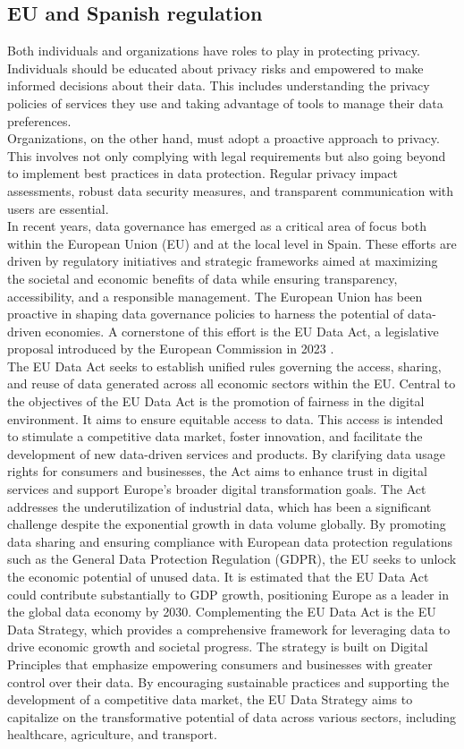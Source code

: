 \subsection{EU and Spanish regulation}
Both individuals and organizations have roles to play in protecting privacy. Individuals should be educated about privacy risks and empowered to make informed decisions about their data. This includes understanding the privacy policies of services they use and taking advantage of tools to manage their data preferences.\\
Organizations, on the other hand, must adopt a proactive approach to privacy. This involves not only complying with legal requirements but also going beyond to implement best practices in data protection. Regular privacy impact assessments, robust data security measures, and transparent communication with users are essential.\\
In recent years, data governance has emerged as a critical area of focus both within the European Union (EU) and at the local level in Spain. These efforts are driven by regulatory initiatives and strategic frameworks aimed at maximizing the societal and economic benefits of data while ensuring transparency, accessibility, and a responsible management. The European Union has been proactive in shaping data governance policies to harness the potential of data-driven economies. A cornerstone of this effort is the EU Data Act, a legislative proposal introduced by the European Commission in 2023 \cite{zotero-166}.\\
The EU Data Act seeks to establish unified rules governing the access, sharing, and reuse of data generated across all economic sectors within the EU.
Central to the objectives of the EU Data Act is the promotion of fairness in the digital environment. It aims to ensure equitable access to data. This access is intended to stimulate a competitive data market, foster innovation, and facilitate the development of new data-driven services and products. By clarifying data usage rights for consumers and businesses, the Act aims to enhance trust in digital services and support Europe's broader digital transformation goals.
The Act addresses the underutilization of industrial data, which has been a significant challenge despite the exponential growth in data volume globally. By promoting data sharing and ensuring compliance with European data protection regulations such as the General Data Protection Regulation (GDPR), the EU seeks to unlock the economic potential of unused data. It is estimated that the EU Data Act could contribute substantially to GDP growth, positioning Europe as a leader in the global data economy by 2030. Complementing the EU Data Act is the EU Data Strategy, which provides a comprehensive framework for leveraging data to drive economic growth and societal progress. The strategy is built on Digital Principles that emphasize empowering consumers and businesses with greater control over their data. By encouraging sustainable practices and supporting the development of a competitive data market, the EU Data Strategy aims to capitalize on the transformative potential of data across various sectors, including healthcare, agriculture, and transport.\\

